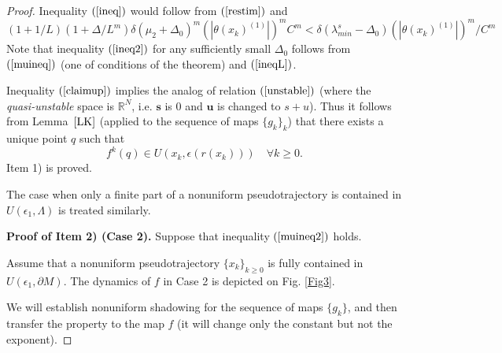 \documentclass[11pt]{article}
\theoremstyle{Mystyle}
\begin{document}
\begin{proof}
Inequality $(\ref{ineq})$ would follow from $(\ref{restim})$ and
\begin{equation}
\label{ineq2}
(1+1/L)(1+\Delta/L^m)\delta(\mu_2+\Delta_0)^m(|\theta(x_k)^{(1)}|)^m C^m < \delta(\lambda^{s}_{min}-\Delta_0)(|\theta(x_k)^{(1)}|)^m/C^m
\end{equation}
Note that inequality $(\ref{ineq2})$ for any sufficiently small $\Delta_0$ follows from
$(\ref{muineq})$ (one of conditions of the theorem) and $(\ref{ineqL})$.

Inequality $(\ref{claimup})$ implies the analog of relation $(\ref{unstable})$ (where the \textit{quasi-unstable} space is $\mathbb{R}^N$, i.e. $\textbf{s}$ is 0 and $\textbf{u}$ is changed to $s+u$). 
Thus it follows from Lemma~$\ref{LK}$ (applied to the sequence of maps $\{g_k\}_k$) that there exists a unique point $q$ such that 
$$f^k(q)\in U(x_{k},\epsilon(r(x_{k})))\quad\forall k\geq0.$$
Item 1) is proved.

The case when only a finite part of a nonuniform pseudotrajectory is contained in $U(\epsilon_1,\Lambda)$ is treated similarly.

\textbf{Proof of Item 2) (Case 2).} Suppose that inequality $(\ref{muineq2})$ holds.

Assume that a nonuniform pseudotrajectory $\{x_k\}_{k\geq0}$ is fully contained in $U(\epsilon_1,\partial M)$.
The dynamics of $f$ in Case 2 is depicted on Fig. \ref{Fig3}.

We will establish nonuniform shadowing for the sequence of maps $\{g_k\}$, and then transfer the property to the map $f$ (it will change only the constant but not the exponent).





\end{proof}
\end{document}
